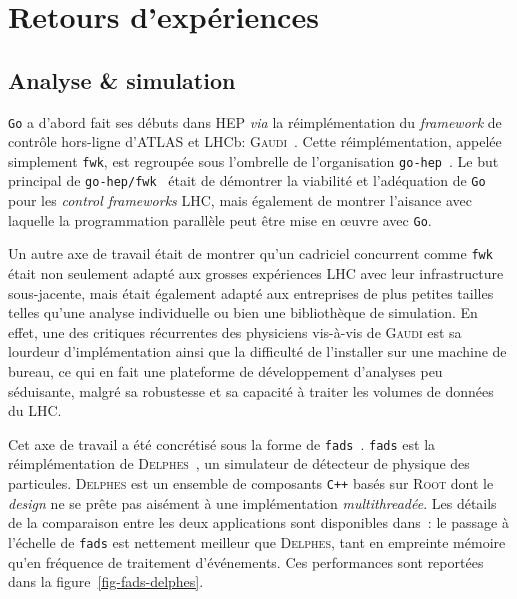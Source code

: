\documentclass[a4paper,french]{article}
\begin{document}
\section{Retours d'exp\'eriences}


\subsection{Analyse \& simulation}

\texttt{Go} a d'abord fait ses d\'ebuts dans HEP \emph{via} la
r\'eimpl\'ementation du \emph{framework} de contr\^ole hors-ligne d'ATLAS et LHCb:
\textsc{Gaudi}~\cite{ref-gaudi}.
Cette r\'eimpl\'ementation, appel\'ee simplement \texttt{fwk}, est regroup\'ee
sous l'ombrelle de l'organisation \texttt{go-hep}~\cite{ref-gohep}.
Le but principal de \texttt{go-hep/fwk}~\cite{ref-gohep-fwk} \'etait de
d\'emontrer la viabilit\'e et l'ad\'equation de \texttt{Go} pour les
\emph{control frameworks} LHC, mais \'egalement de montrer l'aisance avec
laquelle la programmation parall\`ele peut \^etre mise en \oe uvre avec
\texttt{Go}.

Un autre axe de travail \'etait de montrer qu'un cadriciel concurrent comme
\texttt{fwk} \'etait non seulement adapt\'e aux grosses exp\'eriences LHC avec
leur infrastructure sous-jacente, mais \'etait \'egalement adapt\'e aux
entreprises de plus petites tailles telles qu'une analyse individuelle ou bien
une biblioth\`eque de simulation.
En effet, une des critiques r\'ecurrentes des physiciens vis-\`a-vis de
\textsc{Gaudi} est sa lourdeur d'impl\'ementation ainsi que la difficult\'e de
l'installer sur une machine de bureau, ce qui en fait une
plateforme de d\'eveloppement d'analyses peu s\'eduisante, malgr\'e sa
robustesse et sa capacit\'e \`a traiter les volumes de donn\'ees du LHC.

Cet axe de travail a \'et\'e concr\'etis\'e sous la forme de
\texttt{fads}~\cite{ref-fads}.
\texttt{fads} est la r\'eimpl\'ementation de
\textsc{Delphes}~\cite{ref-delphes}, un simulateur de d\'etecteur de physique
des particules.
\textsc{Delphes} est un ensemble de composants \texttt{C++} bas\'es sur
\textsc{Root} dont le \emph{design} ne se pr\^ete pas ais\'ement \`a une
impl\'ementation \emph{multithread\'ee}.
Les d\'etails de la comparaison entre les deux applications sont disponibles
dans~\cite{ref-fads-hsf}: le passage \`a l'\'echelle de \texttt{fads} est
nettement meilleur que \textsc{Delphes}, tant en empreinte m\'emoire qu'en
fr\'equence de traitement d'\'ev\'enements.
Ces performances sont report\'ees dans la figure~\ref{fig-fads-delphes}.
\end{document}
